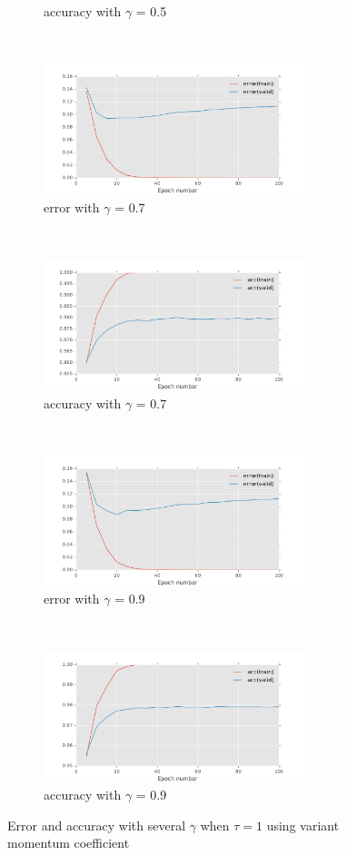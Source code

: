 \documentclass[11pt]{article}
\begin{document}
\begin{figure}[t!]
\begin{subfigure}[t]{0.45\textwidth}
        \caption{accuracy with $\gamma$ = 0.5}
    \end{subfigure}
    ~ 
    \begin{subfigure}[t]{0.45\textwidth}
        \centering
        \includegraphics[height=1.5in]{error_with_gamma_0_7.pdf}
        \caption{error with $\gamma$ = 0.7}
    \end{subfigure}   
    ~
    \begin{subfigure}[t]{0.45\textwidth}
        \centering
        \includegraphics[height=1.5in]{acc_with_gamma_0_7.pdf}
        \caption{accuracy with $\gamma$ = 0.7}
    \end{subfigure}
    ~ 
    \begin{subfigure}[t]{0.45\textwidth}
        \centering
        \includegraphics[height=1.5in]{error_with_gamma_0_9.pdf}
        \caption{error with $\gamma$ = 0.9}
    \end{subfigure}   
    ~
    \begin{subfigure}[t]{0.45\textwidth}
        \centering
        \includegraphics[height=1.5in]{acc_with_gamma_0_9.pdf}
        \caption{accuracy with $\gamma$ = 0.9}
    \end{subfigure}
    \caption{Error and accuracy with several $\gamma$ when $\tau = 1$ using variant momentum coefficient}    
    \label{fig:gamma}
\end{figure}
\end{document}
